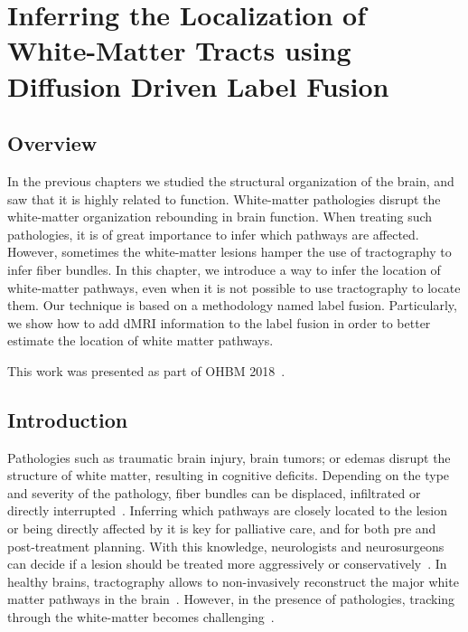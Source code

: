 \chapter{Inferring the Localization of White-Matter Tracts using Diffusion Driven Label Fusion}
\label{ch:multiatlas}

\section{Overview}
In the previous chapters we studied the structural organization of the brain,
and saw that it is highly related to function. White-matter pathologies
disrupt the white-matter organization rebounding in brain function. When
treating such pathologies, it is of great importance to infer which pathways are
affected. However, sometimes the white-matter lesions hamper the use of
tractography to infer fiber bundles. 
In this chapter, we introduce a way to infer the location of white-matter pathways, even
when it is not possible to use tractography to locate them. Our technique is
based on a methodology named label fusion. Particularly, we show how to add
dMRI information to the label fusion in order to better estimate the location
of white matter pathways.

This work was presented as part of OHBM 2018~\cite{Guillermo2018}.

\section{Introduction}
Pathologies such as traumatic brain injury, brain tumors; or edemas disrupt
the structure of white matter, resulting in cognitive deficits. Depending on
the type and severity of the pathology, fiber bundles can be displaced,
infiltrated or directly interrupted~\cite{Schonberg2006, Huisman2009, Won2016}.
Inferring which pathways are closely located to the lesion or being directly
affected by it is key for palliative care, and for both pre and post-treatment planning.
With this knowledge, neurologists and neurosurgeons can decide if a lesion should be
treated more aggressively or  conservatively~\cite{Huisman2009, McGirt2009}.
In healthy brains, tractography allows to non-invasively reconstruct the major
white matter pathways in the brain~\cite{Catani2008}. However, in the presence of 
pathologies, tracking through the white-matter becomes challenging~\cite{Pictorial2004}.

